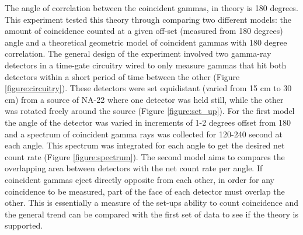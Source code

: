 \documentclass[.../final_report_main.tex]{subfiles}
\begin{document}
The angle of correlation between the coincident gammas, in theory is 180
degrees. This experiment tested this theory through comparing two different
models: the amount of coincidence counted at a given off-set (measured from
180 degrees) angle and a theoretical geometric model of coincident gammas with
180 degree correlation. The general design of the experiment involved two
gamma-ray detectors in a time-gate circuitry wired to only measure gammas that
hit both detectors within a short period of time between the other (Figure
\ref{figure:circuitry}). These detectors were set equidistant (varied from 15 cm
to 30 cm) from a source of NA-22 where one detector was held still, while the
other was rotated freely around the source (Figure \ref{figure:set_up}).
For the first model the angle of the detector was varied in increments of 1-2
degrees offset from 180 and a spectrum of coincident gamma rays was collected
for 120-240 second at each angle. This spectrum was integrated for each angle
to get the desired net count rate (Figure \ref{figure:spectrum}).
The second model aims to compares the overlapping area between detectors with
the net count rate per angle. If coincident gammas eject directly opposite from
each other, in order for any coincidence to be measured, part of the face of
each detector must overlap the other. This is essentially a measure of the
set-ups ability to count coincidence and the general trend can be compared with
the first set of data to see if the theory is supported.
\end{document}
